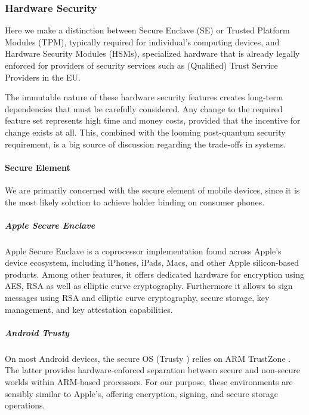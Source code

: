 
\subsubsection{Hardware Security}

Here we make a distinction between Secure Enclave (SE) or Trusted Platform Modules (TPM), typically required for individual's computing devices, and Hardware Security Modules (HSMs), specialized hardware that is already legally enforced for providers of security services such as (Qualified) Trust Service Providers in the EU.

The immutable nature of these hardware security features creates long-term dependencies that must be carefully considered. Any change to the required feature set represents high time and money costs, provided that the incentive for change exists at all. This, combined with the looming post-quantum security requirement, is a big source of discussion regarding the trade-offs in \eid systems.


\paragraph{Secure Element} We are primarily concerned with the secure element of mobile devices, since it is the most likely solution to achieve holder binding on consumer phones.

\subparagraph{Apple Secure Enclave}

Apple Secure Enclave \cite{apple-secure-enclaves} is a coprocessor implementation found across Apple's device ecosystem, including iPhones, iPads, Macs, and other Apple silicon-based products. Among other features, it offers dedicated hardware for encryption using AES, RSA as well as elliptic curve cryptography.
Furthermore it allows to sign messages using RSA and elliptic curve cryptography, secure storage, key management, and key attestation capabilities.

\subparagraph{Android Trusty}

On most Android devices, the secure OS (Trusty \cite{trusty}) relies on ARM TrustZone \cite{arm-trustzone}. The latter provides hardware-enforced separation between secure and non-secure worlds within ARM-based processors.
For our purpose, these environments are sensibly similar to Apple's, offering encryption, signing, and secure storage operations.


